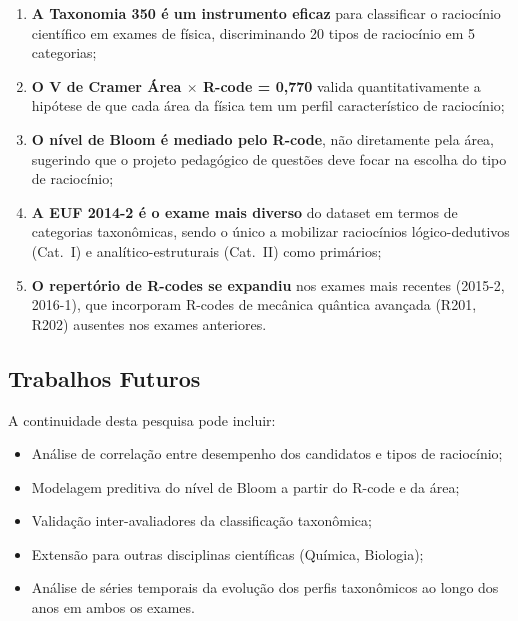 \documentclass[12pt,a4paper]{article}
\begin{document}
\begin{enumerate}
  \item \textbf{A Taxonomia 350 é um instrumento eficaz} para classificar
    o raciocínio científico em exames de física, discriminando 20 tipos
    de raciocínio em 5 categorias;

  \item \textbf{O V de Cramer Área $\times$ R-code = 0,770} valida
    quantitativamente a hipótese de que cada área da física tem um
    perfil característico de raciocínio;

  \item \textbf{O nível de Bloom é mediado pelo R-code}, não diretamente
    pela área, sugerindo que o projeto pedagógico de questões deve
    focar na escolha do tipo de raciocínio;

  \item \textbf{A EUF 2014-2 é o exame mais diverso} do dataset em
    termos de categorias taxonômicas, sendo o único a mobilizar
    raciocínios lógico-dedutivos (Cat.~I) e analítico-estruturais
    (Cat.~II) como primários;

  \item \textbf{O repertório de R-codes se expandiu} nos exames mais
    recentes (2015-2, 2016-1), que incorporam R-codes de mecânica
    quântica avançada (R201, R202) ausentes nos exames anteriores.
\end{enumerate}

\subsection{Trabalhos Futuros}

A continuidade desta pesquisa pode incluir:
\begin{itemize}
  \item Análise de correlação entre desempenho dos candidatos e tipos
    de raciocínio;
  \item Modelagem preditiva do nível de Bloom a partir do R-code e da
    área;
  \item Validação inter-avaliadores da classificação taxonômica;
  \item Extensão para outras disciplinas científicas (Química, Biologia);
  \item Análise de séries temporais da evolução dos perfis taxonômicos
    ao longo dos anos em ambos os exames.
\end{itemize}
\end{document}
